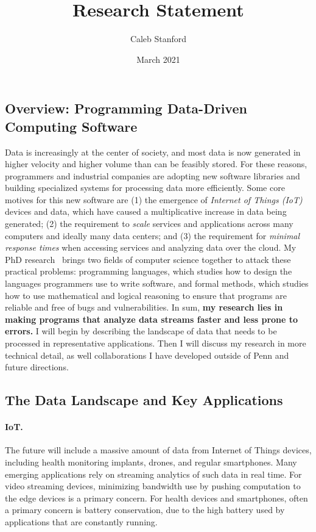 \documentclass{article}
\title{Research Statement}
\author{Caleb Stanford}
\date{March 2021}
\begin{document}
\maketitle{}

\subsection*{Overview: Programming Data-Driven Computing Software}

Data is increasingly at the center of society, and most data is now generated in higher velocity and higher volume than can be feasibly stored.
For these reasons, programmers and industrial companies are adopting new software libraries
and building specialized systems for processing data more efficiently.
Some core motives for this new software are (1) the emergence of \emph{Internet of Things (IoT)} devices and data, which have caused a multiplicative increase in data being generated; (2) the requirement to \emph{scale} services and applications across many computers and ideally many data centers; and (3)
the requirement for \emph{minimal response times} when accessing services and analyzing data over the cloud.
My PhD research~\cite{icalp17,tcs20,popl19,pldi19,oopsla20} brings two fields of computer science together to attack these practical problems: programming languages, which studies how to design the languages programmers use to write software, and formal methods, which studies how to use mathematical and logical reasoning to ensure that programs are reliable and free of bugs and vulnerabilities.
In sum,
\textbf{my research lies in making programs that analyze data streams faster and less prone to errors.}
I will begin by describing the landscape of data that needs to be processed in representative applications.
Then I will discuss my research in more technical detail, as well collaborations I have developed outside of Penn and future directions.

\subsection*{The Data Landscape and Key Applications}

\paragraph*{IoT.}
The future will include a massive amount of data from Internet of Things devices, including health monitoring implants, drones, and regular smartphones. Many emerging applications rely on streaming analytics of such data in real time. 
For video streaming devices, minimizing bandwidth use by pushing computation to the edge devices is a primary concern.
For health devices and smartphones, often a primary concern is battery conservation, due to the high battery used by applications that are constantly running.
\end{document}
